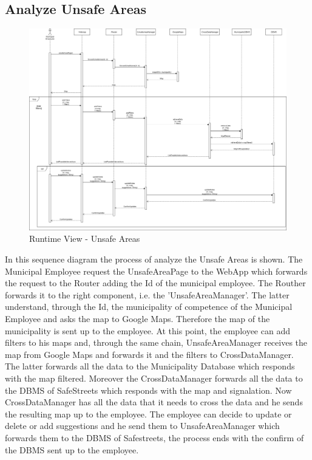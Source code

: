         \subsection{Analyze Unsafe Areas}
        \begin{figure}[H]
            \includegraphics[scale=0.28]{dd/resources/images/RuntimeView-UnsafeAreas}
            \caption{Runtime View - Unsafe Areas}        
        \end{figure}
        In this sequence diagram the process of analyze the Unsafe Areas is
        shown. The Municipal Employee request the UnsafeAreaPage to the WebApp
        which forwards the request to the Router adding the Id of the municipal
        employee. The Routher forwards it to the right component, i.e. the
        'UnsafeAreaManager'. The latter understand, through the Id, the
        municipality of competence of the Municipal Employee and asks the map to
        Google Maps. Therefore the map of the municipality is sent up to the
        employee. At this point, the employee can add filters to his maps and,
        through the same chain, UnsafeAreaManager receives the map from Google
        Maps and forwards it and the filters to CrossDataManager. The latter
        forwards all the data to the Municipality Database which responds with
        the map filtered. Moreover the CrossDataManager forwards all the data to
        the DBMS of SafeStreets which responds with the map and signalation. Now
        CrossDataManager has all the data that it needs to cross the data and he
        sends the resulting map up to the employee. The employee can decide to
        update or delete or add suggestions and he send them to
        UnsafeAreaManager which forwards them to the DBMS of Safestreets, the
        process ends with the confirm of the DBMS sent up to the employee.

